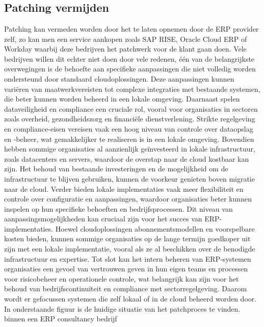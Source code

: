 \documentclass[dutch,dit,thesis]{hogentreport}
\begin{document}
\chapter{}
\label{ch:corpus}

\section{Patching vermijden}

Patching kan vermeden worden door het te laten opnemen door de ERP provider zelf, zo kan men een service aankopen zoals SAP RISE, Oracle Cloud ERP of Workday waarbij deze bedrijven het patchwerk voor de klant gaan doen. Vele bedrijven
 willen dit echter niet doen door vele redenen, één van de belangrijkste overwegingen is de behoefte aan specifieke aanpassingen die niet volledig worden ondersteund door standaard cloudoplossingen. 
 Deze aanpassingen kunnen variëren van maatwerkvereisten tot complexe integraties met bestaande systemen, die beter kunnen worden beheerd in een lokale omgeving.
Daarnaast spelen dataveiligheid en compliance een cruciale rol, vooral voor organisaties in sectoren zoals overheid, gezondheidszorg en financiële dienstverlening.
 Strikte regelgeving en compliance-eisen vereisen vaak een hoog niveau van controle over dataopslag en -beheer, wat gemakkelijker te realiseren is in een lokale omgeving.
Bovendien hebben sommige organisaties al aanzienlijk geïnvesteerd in lokale infrastructuur, zoals datacenters en servers, waardoor de overstap naar de cloud kostbaar kan zijn.
 Het behoud van bestaande investeringen en de mogelijkheid om de infrastructuur te blijven gebruiken, kunnen de voorkeur genieten boven migratie naar de cloud.
Verder bieden lokale implementaties vaak meer flexibiliteit en controle over configuratie en aanpassingen, waardoor organisaties beter kunnen inspelen op hun specifieke behoeften en 
bedrijfsprocessen. Dit niveau van aanpassingsmogelijkheden kan cruciaal zijn voor het succes van ERP-implementaties.
Hoewel cloudoplossingen abonnementsmodellen en voorspelbare kosten bieden, kunnen sommige organisaties op de lange termijn goedkoper uit zijn met een lokale implementatie, vooral als
 ze al beschikken over de benodigde infrastructuur en expertise.
Tot slot kan het intern beheren van ERP-systemen organisaties een gevoel van vertrouwen geven in hun eigen teams en processen voor risicobeheer en operationele controle, wat belangrijk 
kan zijn voor het behoud van bedrijfscontinuïteit en compliance met sectorregelgeving. Daarom wordt er gefocussen systemen die zelf lokaal of in de cloud beheerd worden door. In onderstaande figuur is de huidige situatie van het patchproces te vinden. binnen een ERP consultancy bedrijf \\
\end{document}
